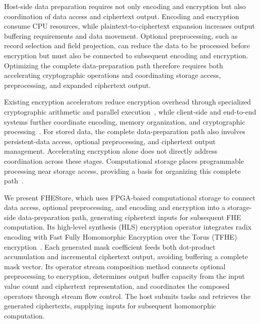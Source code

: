 \documentclass[sigconf,anonymous,balance=false]{acmart}
\newcommand{\bodypar}{\par\vskip 0pt plus 6pt\relax}
\begin{document}
Host-side data preparation requires not only encoding and encryption but also coordination of data access and ciphertext output. Encoding and encryption consume CPU resources, while plaintext-to-ciphertext expansion increases output buffering requirements and data movement. Optional preprocessing, such as record selection and field projection, can reduce the data to be processed before encryption but must also be connected to subsequent encoding and encryption. Optimizing the complete data-preparation path therefore requires both accelerating cryptographic operations and coordinating storage access, preprocessing, and expanded ciphertext output.
\bodypar

Existing encryption accelerators reduce encryption overhead through specialized cryptographic arithmetic and parallel execution~\cite{mert2020bfv,lee2023ckks,feryputri2025lwe,syafalni2026multicore}, while client-side and end-to-end systems further coordinate encoding, memory organization, and cryptographic processing~\cite{krieger2024aloha,yune2025abcfhe,vanderhagen2022choco,gupta2024memfhe}. For stored data, the complete data-preparation path also involves persistent-data access, optional preprocessing, and ciphertext output management. Accelerating encryption alone does not directly address coordination across these stages. Computational storage places programmable processing near storage access, providing a basis for organizing this complete path~\cite{snia2025csmodel,ruan2019insider,wong2024dongle,woods2014ibex}.
\bodypar

We present FHEStore, which uses FPGA-based computational storage to connect data access, optional preprocessing, and encoding and encryption into a storage-side data-preparation path, generating ciphertext inputs for subsequent FHE computation. Its high-level synthesis (HLS) encryption operator integrates radix encoding with Fast Fully Homomorphic Encryption over the Torus (TFHE) encryption~\cite{chillotti2020tfhe}. Each generated mask coefficient feeds both dot-product accumulation and incremental ciphertext output, avoiding buffering a complete mask vector. Its operator stream composition method connects optional preprocessing to encryption, determines output buffer capacity from the input value count and ciphertext representation, and coordinates the composed operators through stream flow control. The host submits tasks and retrieves the generated ciphertexts, supplying inputs for subsequent homomorphic computation.
\bodypar
\end{document}
